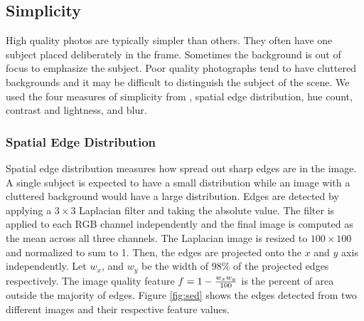 \documentclass[conference,a4paper]{IEEEtran}
\begin{document}
  \subsection{Simplicity}
  High quality photos are typically simpler than others.  They often have one subject placed deliberately in the frame.  Sometimes the background is out of focus to emphasize the subject.  Poor quality photographs tend to have cluttered backgrounds and it may be difficult to distinguish the subject of the scene.  We used the four measures of simplicity from \cite{ke2006design}, spatial edge distribution, hue count, contrast and lightness, and blur.

  \subsubsection{Spatial Edge Distribution}
  Spatial edge distribution measures how spread out sharp edges are in the image.  A single subject is expected to have a small distribution while an image with a cluttered background would have a large distribution.  Edges are detected by applying a $3\times3$ Laplacian filter and taking the absolute value.  The filter is applied to each RGB channel independently and the final image is computed as the mean across all three channels.  The Laplacian image is resized to $100\times100$ and normalized to sum to 1.  Then, the edges are projected onto the $x$ and $y$ axis independently.  Let $w_x$, and $w_y$ be the width of $98\%$ of the projected edges respectively.  The image quality feature $f = 1 - {w_x w_y \over 100}$ is the percent of area outside the majority of edges.  Figure \ref{fig:sed} shows the edges detected from two different images and their respective feature values.
\end{document}
